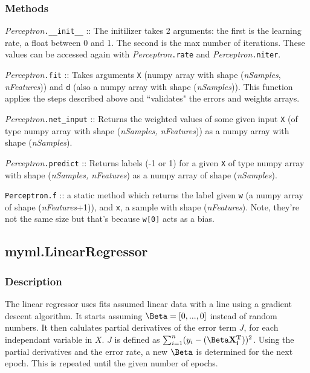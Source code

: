 \documentclass{article}
\begin{document}
\subsubsection{Methods}

\textit{Perceptron}\texttt{.\_\_init\_\_} :: The initilizer takes 2 arguments: the
first is the learning rate, a float between 0 and 1. The second is the max
number of iterations. These values can be accessed again with
\textit{Perceptron}\texttt{.rate} and \textit{Perceptron}\texttt{.niter}.

\textit{Perceptron}\texttt{.fit} :: Takes arguments \texttt{X} (numpy array
with shape (\textit{nSamples}, \textit{nFeatures})) and \texttt{d} (also a
numpy array with shape (\textit{nSamples})). This function applies the steps
described above and ``validates" the errors and weights arrays.

\textit{Perceptron}\texttt{.net\_input} :: Returns the weighted values of some
given input \texttt{X} (of type numpy array with shape
(\textit{nSamples, nFeatures})) as a numpy array with shape (\textit{nSamples}).

\textit{Perceptron}\texttt{.predict} :: Returns labels (-1 or 1) for a given
\texttt{X} of type numpy array with shape (\textit{nSamples, nFeatures}) as a
numpy array of shape (\textit{nSamples}).

\texttt{Perceptron.f} :: a static method which returns the label given
\texttt{w} (a numpy array of shape (\textit{nFeatures}+1)), and \texttt{x}, a
sample with shape (\textit{nFeatures}). Note, they're not the same size but
that's because \texttt{w[0]} acts as a bias.

\subsection{myml.LinearRegressor}

\subsubsection{Description}

The linear regressor uses fits assumed linear data with a line using a gradient
descent algorithm. It starts assuming $\Beta = [0, ..., 0]$ instead of random
numbers. It then calulates partial derivatives of the error term $J$, for each
independant variable in $X$. $J$ is defined as $\sum_{i=1}^{n}(y_i-(\mathbf{\Beta}\mathbf{X^T_i}))^2$.
Using the partial derivatives and the error rate, a new $\Beta$ is determined for
the next epoch. This is repeated until the given number of epochs.
\end{document}
